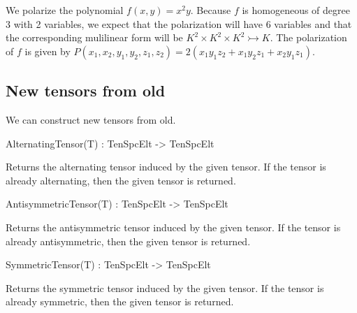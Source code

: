 \begin{example}[TensorPolarization]
We polarize the polynomial $f(x,y)=x^2y$. 
Because $f$ is homogeneous of degree 3 with 2 variables, we expect that the polarization will have 6 variables and that the corresponding mulilinear form will be $K^2\times K^2\times K^2\rightarrowtail K$.
The polarization of $f$ is given by $P(x_1,x_2,y_1,y_2,z_1,z_2 ) = 2 (x_1y_1z_2 + x_1y_2z_1 + x_2y_1z_1)$.

\end{example}


\subsection{New tensors from old}
We can construct new tensors from old.

\begin{intrinsics}
AlternatingTensor(T) : TenSpcElt -> TenSpcElt
\end{intrinsics}

Returns the alternating tensor induced by the given tensor. If 
the tensor is already alternating, then the given tensor is returned.

\begin{intrinsics}
AntisymmetricTensor(T) : TenSpcElt -> TenSpcElt
\end{intrinsics}

Returns the antisymmetric tensor induced by the given tensor. If 
the tensor is already antisymmetric, then the given tensor is returned.

\begin{intrinsics}
SymmetricTensor(T) : TenSpcElt -> TenSpcElt
\end{intrinsics}

Returns the symmetric tensor induced by the given tensor. If the tensor is 
already symmetric, then the given tensor is returned.

